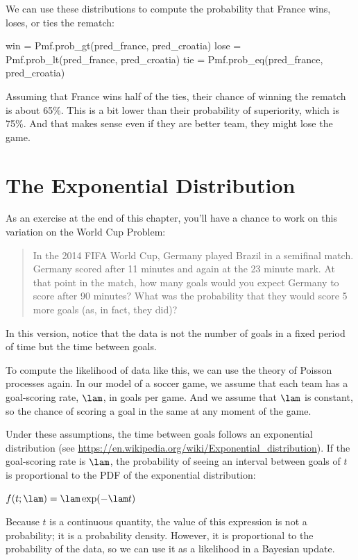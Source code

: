 \documentclass[12pt]{book}
\theoremstyle{exercise}
\begin{document}
We can use these distributions to compute the probability that France wins, loses, or ties the rematch:

\begin{code}
win = Pmf.prob_gt(pred_france, pred_croatia)
lose = Pmf.prob_lt(pred_france, pred_croatia)
tie = Pmf.prob_eq(pred_france, pred_croatia)
\end{code}

Assuming that France wins half of the ties, their chance of winning the rematch is about 65\%.
This is a bit lower than their probability of superiority, which is 75\%. And that makes sense even if they are better team, they might lose the game.


\section{The Exponential Distribution}
\label{exponential}

As an exercise at the end of this chapter, you'll have a chance to work on  this variation on the World Cup Problem:

\begin{quote}
In the 2014 FIFA World Cup, Germany played Brazil in a semifinal match. Germany scored after 11 minutes and again at the 23 minute mark. 
At that point in the match, how many goals would you expect Germany to score after 90 minutes? 
What was the probability that they would score 5 more goals (as, in fact, they did)?
\end{quote}

In this version, notice that the data is not the number of goals in a fixed period of time but the time between goals.

To compute the likelihood of data like this, we can use the theory of Poisson processes again.  
In our model of a soccer game, we assume that each team has a goal-scoring rate, $\lam$, in goals per game.  
And we assume that $\lam$ is constant, so the chance of scoring a goal in the same at any moment of the game.

Under these assumptions, the time between goals follows an exponential distribution (see \url{https://en.wikipedia.org/wiki/Exponential_distribution}).
If the goal-scoring rate is $\lam$, the probability of seeing an interval between goals of $t$ is proportional to the PDF of the exponential distribution:

$f(t; \lam) = \lam \exp(-\lam t)$

Because $t$ is a continuous quantity, the value of this expression is not a probability; it is a probability density.  
However, it is proportional to the probability of the data, so we can use it as a likelihood in a Bayesian update.
\end{document}

